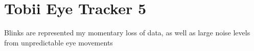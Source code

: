 \section{Tobii Eye Tracker 5} \label{sec:hwds_TobiiEyeTracker5}

Blinks are represented my momentary loss of data, as well as large noise levels from unpredictable eye movements